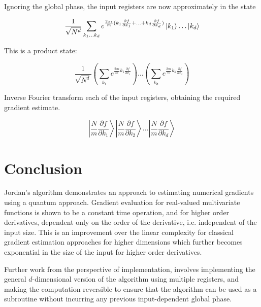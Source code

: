 \documentclass{article}
\begin{document}
Ignoring the global phase, the input registers are now approximately in the state

\begin{equation}
  \frac{1}{\sqrt{N^d}} \sum_{k_1 \ldots k_d}
  e^{\frac{2 \pi \iota}{m} (
      k_1 \frac{\partial f}{\partial x_1} + \ldots + k_d \frac{\partial f}{\partial x_d}
      )}
  \ket{k_1} \ldots \ket{k_d}
\end{equation}

This is a product state:

\begin{equation}
  \frac{1}{\sqrt{N^d}}
  \left(
  \sum_{k_1}
  e^{\frac{2 \pi \iota}{m} k_1 \frac{\partial f}{\partial x_1}}
  \right)
  \ldots
  \left(
  \sum_{k_d}
  e^{\frac{2 \pi \iota}{m} k_d \frac{\partial f}{\partial x_d}}
  \right)
\end{equation}

Inverse Fourier transform each of the input registers, obtaining the required gradient estimate.

\begin{equation}
  \left| \frac{N}{m} \frac{\partial f}{\partial k_1} \right\rangle
  \left| \frac{N}{m} \frac{\partial f}{\partial k_2} \right\rangle
  \ldots
  \left| \frac{N}{m} \frac{\partial f}{\partial k_d} \right\rangle
\end{equation}

\section{Conclusion}

Jordan's algorithm demonstrates an approach to estimating numerical gradients using a quantum approach.
Gradient evaluation for real-valued multivariate functions is shown to be a constant time operation, and
for higher order derivatives, dependent only on the order of the derivative, i.e. independent of the input size.
This is an improvement over the linear complexity for classical gradient estimation approaches for higher dimensions
which further becomes exponential in the size of the input for higher order derivatives.

Further work from the perspective of implementation, involves implementing the general \(d\)-dimensional version of
the algorithm using multiple registers, and making the computation reversible to ensure that the algorithm can be
used as a subroutine without incurring any previous input-dependent global phase.
\end{document}
